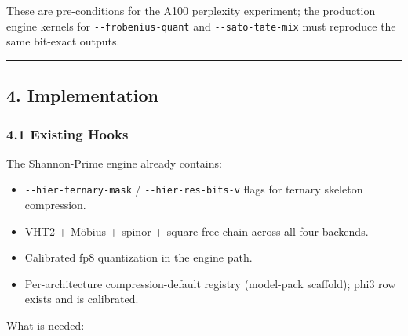 \documentclass[
  11pt,
]{article}
\providecommand{\tightlist}{%
  \setlength{\itemsep}{0pt}\setlength{\parskip}{0pt}}
\begin{document}
These are pre-conditions for the A100 perplexity experiment; the
production engine kernels for \texttt{-\/-frobenius-quant} and
\texttt{-\/-sato-tate-mix} must reproduce the same bit-exact outputs.

\begin{center}\rule{0.5\linewidth}{0.5pt}\end{center}

\hypertarget{implementation}{%
\subsection{4. Implementation}\label{implementation}}

\hypertarget{existing-hooks}{%
\subsubsection{4.1 Existing Hooks}\label{existing-hooks}}

The Shannon-Prime engine already contains:

\begin{itemize}
\tightlist
\item
  \texttt{-\/-hier-ternary-mask} / \texttt{-\/-hier-res-bits-v} flags
  for ternary skeleton compression.
\item
  VHT2 + Möbius + spinor + square-free chain across all four backends.
\item
  Calibrated fp8 quantization in the engine path.
\item
  Per-architecture compression-default registry (model-pack scaffold);
  phi3 row exists and is calibrated.
\end{itemize}

What is needed:
\end{document}
